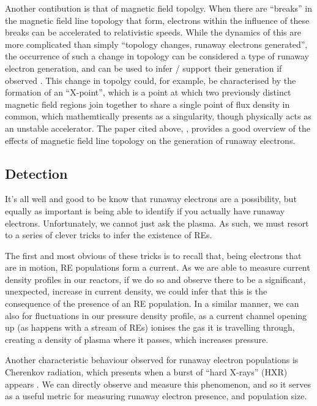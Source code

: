 Another contibution is that of magnetic field topolgy. When there are ``breaks'' in the magnetic field line topology that form, 
electrons within the influence of these breaks can be accelerated to relativistic speeds. While the dynamics of this are more 
complicated than simply ``topology changes, runaway electrons generated'', the occurrence of such a change in topology can be 
considered a type of runaway electron generation, and can be used to infer / support their generation if observed \cite{runaway-electrons}.
This change in topolgy could, for example, be characterised by the formation of an ``X-point'', which is a point at which two previously 
distinct magnetic field regions join together to share a single point of flux density in common, which mathemtically presents as 
a singularity, though physically acts as an unstable accelerator. The paper cited above, \cite{runaway-electrons}, provides a good overview of the effects of 
magnetic field line topology on the generation of runaway electrons.


\subsection{Detection}

It's all well and good to be know that runaway electrons are a possibility, but equally as important is being able 
to identify if you actually have runaway electrons. Unfortunately, we cannot just ask the plasma. As such, we must resort 
to a series of clever tricks to infer the existence of REs. 

The first and most obvious of these tricks is to recall that, being electrons that are in motion, RE populations form a current. As 
we are able to measure current density profiles in our reactors, if we do so and observe there to be a significant, unexpected, increase in 
current density, we could infer that this is the consequence of the presence of an RE population. In a similar manner, 
we can also for fluctuations in our pressure density profile, as a current channel opening up (as happens with a stream 
of REs) ionises the gas it is travelling through, creating a density of plasma where it passes, which 
increases pressure.

Another characteristic behaviour observed for runaway electron populations is Cherenkov radiation, 
which presents when a burst of ``hard X-rays'' (HXR) appears \cite{cherenkov-radiation}. We can directly 
observe and measure this phenomenon, and so it serves as a useful metric for measuring runaway electron presence, and
population size.

